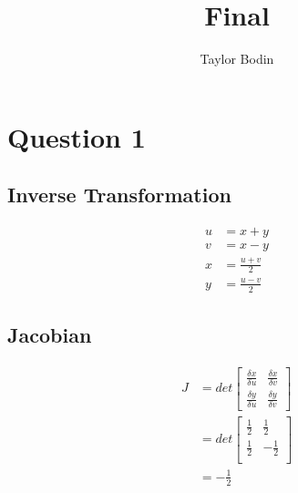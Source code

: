 \documentclass[12pt]{article}
\begin{document}
\title{Final}
\author{Taylor Bodin}
\maketitle

\section{Question 1}
\subsection{Inverse Transformation}
\begin{align*}
u &= x + y \\
v &= x - y \\
x &= \frac{u+v}{2} \\
y &= \frac{u-v}{2}
\end{align*}

\subsection{Jacobian}
\begin{align*}
  J &= det\begin{bmatrix}
    \frac{\delta x}{\delta u} & \frac{\delta x}{\delta v} \\
    \frac{\delta y}{\delta u} & \frac{\delta y}{\delta v}
  \end{bmatrix} \\
  &= det\begin{bmatrix}
    \frac{1}{2} & \frac{1}{2} \\
    \frac{1}{2} & -\frac{1}{2} \\
  \end{bmatrix} \\
  &= -\frac{1}{2}
\end{align*}
\end{document}

